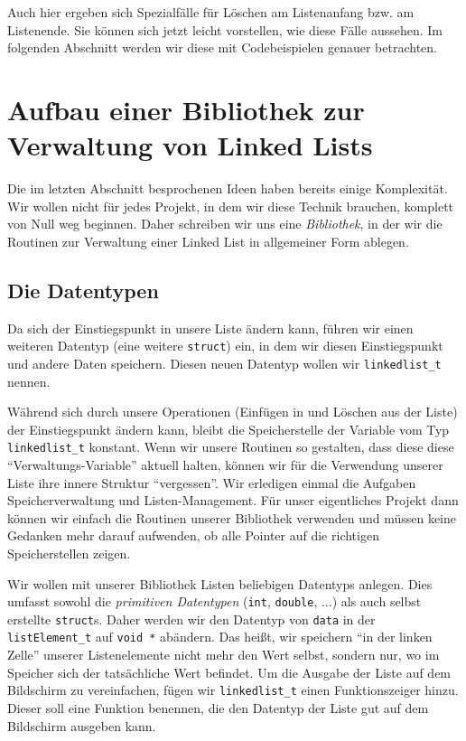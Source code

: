 Auch hier ergeben sich Spezialfälle für Löschen am Listenanfang bzw. am Listenende. Sie können sich jetzt leicht vorstellen, wie diese Fälle aussehen. Im folgenden Abschnitt werden wir diese mit Codebeispielen genauer betrachten.

\section{Aufbau einer Bibliothek zur Verwaltung von Linked Lists}
Die im letzten Abschnitt besprochenen Ideen haben bereits einige Komplexität. Wir wollen nicht für jedes Projekt, in dem wir diese Technik brauchen, komplett von Null weg beginnen. Daher schreiben wir uns eine \emph{Bibliothek}, in der wir die Routinen zur Verwaltung einer Linked List in allgemeiner Form ablegen. 

\subsection{Die Datentypen}
Da sich der Einstiegspunkt in unsere Liste ändern kann, führen wir einen weiteren Datentyp (eine weitere \texttt{struct}) ein, in dem wir diesen Einstiegspunkt und andere Daten speichern. Diesen neuen Datentyp wollen wir \texttt{linkedlist\_t} nennen.

Während sich durch unsere Operationen (\eg Einfügen in und Löschen aus der Liste) der Einstiegspunkt ändern kann, bleibt die Speicherstelle der Variable vom Typ \texttt{linkedlist\_t} konstant. Wenn wir unsere Routinen so gestalten, dass diese diese \enquote{Verwaltungs-Variable} aktuell halten, können wir für die Verwendung unserer Liste ihre innere Struktur \enquote{vergessen}. Wir erledigen einmal die Aufgaben Speicherverwaltung und Listen-Management. Für unser eigentliches Projekt dann können wir einfach die Routinen unserer Bibliothek verwenden und müssen keine Gedanken mehr darauf aufwenden, ob alle Pointer auf die richtigen Speicherstellen zeigen.

Wir wollen mit unserer Bibliothek Listen beliebigen Datentyps anlegen. Dies umfasst sowohl die \emph{primitiven Datentypen} (\texttt{int}, \texttt{double}, ...) als auch selbst erstellte \texttt{struct}s. Daher werden wir den Datentyp von \texttt{data} in der \texttt{listElement\_t} auf \texttt{void *} abändern. Das heißt, wir speichern \enquote{in der linken Zelle} unserer Listenelemente nicht mehr den Wert selbst, sondern nur, wo im Speicher sich der tatsächliche Wert befindet. Um die Ausgabe der Liste auf dem Bildschirm zu vereinfachen, fügen wir \texttt{linkedlist\_t} einen Funktionszeiger hinzu. Dieser soll eine Funktion benennen, die den Datentyp der Liste gut auf dem Bildschirm ausgeben kann.

